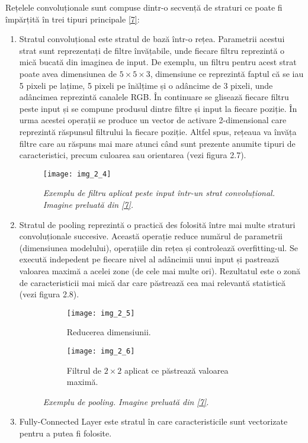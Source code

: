 Rețelele convoluționale sunt compuse dintr-o secvență de straturi ce poate fi împărțită în trei tipuri principale \hyperlink{cs231n}{[7]}:
\begin{enumerate}
  \item Stratul convoluțional este stratul de bază într-o rețea. Parametrii acestui strat sunt reprezentați de filtre învățabile, unde fiecare filtru reprezintă o mică bucată din imaginea de input. De exemplu, un filtru pentru acest strat poate avea dimensiunea de $5 \times 5 \times 3$, dimensiune ce reprezintă faptul că se iau 5 pixeli pe lațime, 5 pixeli pe înălțime și o adâncime de 3 pixeli, unde adâncimea reprezintă canalele RGB. În continuare se glisează fiecare filtru peste input și se compune produsul dintre filtre și input la fiecare poziție. În urma acestei operații se produce un vector de activare 2-dimensional care reprezintă răspunsul filtrului la fiecare poziție. Altfel spus, rețeaua va învăța filtre care au răspuns mai mare atunci când sunt prezente anumite tipuri de caracteristici, precum culoarea sau orientarea (vezi figura 2.7).
\begin{figure}[!h]
	\centering
	\texttt{[image: img\_2\_4]}
	\caption[Exemplu de filtru aplicat peste input]{\textit{Exemplu de filtru aplicat peste input într-un strat convoluțional. Imagine preluată din \hyperlink{datameetsmedia}{[7]}.}}
\end{figure}   
  
  \item Stratul de pooling reprezintă o practică des folosită între mai multe straturi convoluționale succesive. Această operație reduce numărul de parametrii (dimensiunea modelului), operațiile din rețea și controlează overfitting-ul. Se execută indepedent pe fiecare nivel al adâncimii unui input și pastrează valoarea maximă a acelei zone (de cele mai multe ori). Rezultatul este o zonă de caracteristicii mai mică dar care păstrează cea mai relevantă statistică (vezi figura 2.8).
\begin{figure}[!tbp]
  \begin{subfigure}[b]{0.4\textwidth}
    \texttt{[image: img\_2\_5]}
    \caption{Reducerea dimensiunii.}
    \label{fig:f1}
  \end{subfigure}
  \hfill
  \begin{subfigure}[b]{0.4\textwidth}
    \texttt{[image: img\_2\_6]}
    \caption{Filtrul de $2\times2$ aplicat ce păstrează valoarea maximă.}
    \label{fig:f2}
  \end{subfigure}
  \caption[Exemplu de pooling]{\textit{Exemplu de pooling. Imagine preluată din \hyperlink{datameetsmedia}{[7]}.}}
\end{figure}
  
  \item Fully-Connected Layer este stratul în care caracteristicile sunt vectorizate pentru a putea fi folosite.
\end{enumerate}

